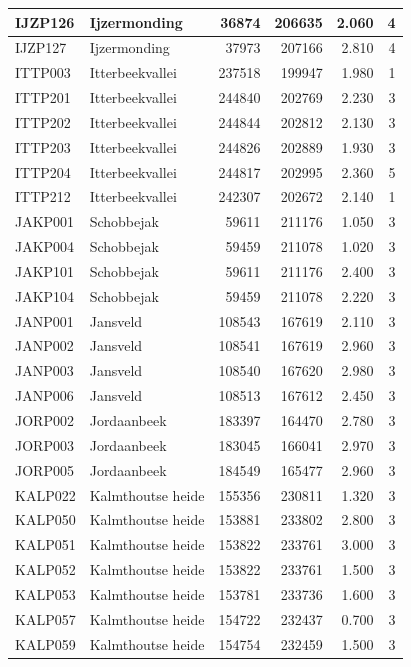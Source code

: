 \documentclass[11pt,]{book}
\begin{document}
\begin{table}
\begin{tabular}[t]{l|l|r|r|r|r}
\hline
IJZP126 & Ijzermonding & 36874 & 206635 & 2.060 & 4\\
\hline
IJZP127 & Ijzermonding & 37973 & 207166 & 2.810 & 4\\
\hline
ITTP003 & Itterbeekvallei & 237518 & 199947 & 1.980 & 1\\
\hline
ITTP201 & Itterbeekvallei & 244840 & 202769 & 2.230 & 3\\
\hline
ITTP202 & Itterbeekvallei & 244844 & 202812 & 2.130 & 3\\
\hline
ITTP203 & Itterbeekvallei & 244826 & 202889 & 1.930 & 3\\
\hline
ITTP204 & Itterbeekvallei & 244817 & 202995 & 2.360 & 5\\
\hline
ITTP212 & Itterbeekvallei & 242307 & 202672 & 2.140 & 1\\
\hline
JAKP001 & Schobbejak & 59611 & 211176 & 1.050 & 3\\
\hline
JAKP004 & Schobbejak & 59459 & 211078 & 1.020 & 3\\
\hline
JAKP101 & Schobbejak & 59611 & 211176 & 2.400 & 3\\
\hline
JAKP104 & Schobbejak & 59459 & 211078 & 2.220 & 3\\
\hline
JANP001 & Jansveld & 108543 & 167619 & 2.110 & 3\\
\hline
JANP002 & Jansveld & 108541 & 167619 & 2.960 & 3\\
\hline
JANP003 & Jansveld & 108540 & 167620 & 2.980 & 3\\
\hline
JANP006 & Jansveld & 108513 & 167612 & 2.450 & 3\\
\hline
JORP002 & Jordaanbeek & 183397 & 164470 & 2.780 & 3\\
\hline
JORP003 & Jordaanbeek & 183045 & 166041 & 2.970 & 3\\
\hline
JORP005 & Jordaanbeek & 184549 & 165477 & 2.960 & 3\\
\hline
KALP022 & Kalmthoutse heide & 155356 & 230811 & 1.320 & 3\\
\hline
KALP050 & Kalmthoutse heide & 153881 & 233802 & 2.800 & 3\\
\hline
KALP051 & Kalmthoutse heide & 153822 & 233761 & 3.000 & 3\\
\hline
KALP052 & Kalmthoutse heide & 153822 & 233761 & 1.500 & 3\\
\hline
KALP053 & Kalmthoutse heide & 153781 & 233736 & 1.600 & 3\\
\hline
KALP057 & Kalmthoutse heide & 154722 & 232437 & 0.700 & 3\\
\hline
KALP059 & Kalmthoutse heide & 154754 & 232459 & 1.500 & 3\\

\end{tabular}
\end{table}
\end{document}
